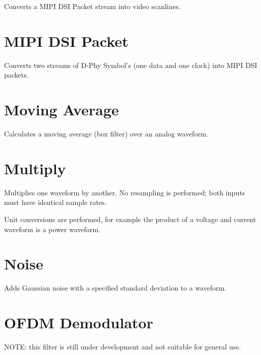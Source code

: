 Converts a MIPI DSI Packet stream into video scanlines.

\pagebreak
\section{MIPI DSI Packet}

Converts two streams of D-Phy Symbol's (one data and one clock) into MIPI DSI packets.

\pagebreak
\section{Moving Average}

Calculates a moving average (box filter) over an analog waveform.

\pagebreak
\section{Multiply}

Multiplies one waveform by another. No resampling is performed; both inputs must have identical sample rates.

Unit conversions are performed, for example the product of a voltage and current waveform is a power waveform.

\pagebreak
\section{Noise}

Adds Gaussian noise with a specified standard deviation to a waveform.

\pagebreak
\section{OFDM Demodulator}

NOTE: this filter is still under development and not suitable for general use.

